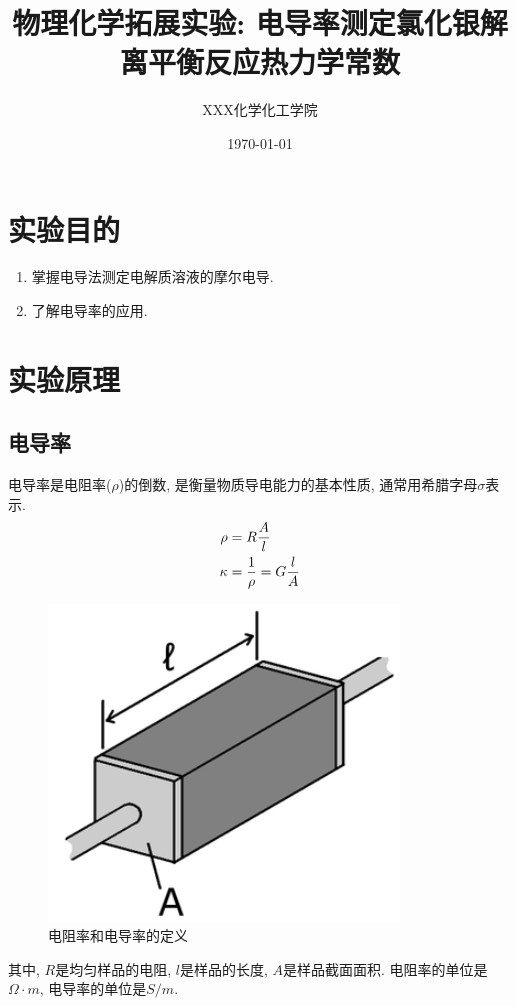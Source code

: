 \documentclass[a4paper]{article}
\title{物理化学拓展实验: 电导率测定氯化银解离平衡反应热力学常数}
\author{XXX\quad 123456789\quad 化学化工学院}
\date{\today}
\begin{document}
\maketitle
\section{实验目的}
\begin{enumerate}
	\item 掌握电导法测定电解质溶液的摩尔电导.
	\item 了解电导率的应用.
\end{enumerate}
\section{实验原理}
\subsection{电导率}
电导率是电阻率($\rho$)的倒数, 是衡量物质导电能力的基本性质, 通常用希腊字母$\sigma$表示.
\begin{equation}
	\centering
	\begin{aligned}
		\rho &= R\frac{A}{l}\\
		\kappa &= \frac{1}{\rho}= G\frac{l}{A}\\
	\end{aligned}
\end{equation}
\begin{figure}[H]
	\centering
	\includegraphics[width=0.2\paperwidth]{fig/resistivity_conductivity_definition.PNG}
	\caption{电阻率和电导率的定义}
\end{figure}
其中, $R$是均匀样品的电阻, $l$是样品的长度, $A$是样品截面面积.
电阻率的单位是$\Omega\cdot m$, 电导率的单位是$S/m$.
\end{document}
